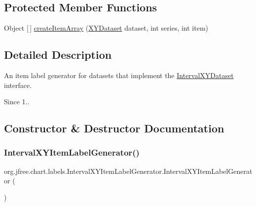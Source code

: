 \subsection*{Protected Member Functions}
\begin{DoxyCompactItemize}
\item 
Object \mbox{[}$\,$\mbox{]} \mbox{\hyperlink{classorg_1_1jfree_1_1chart_1_1labels_1_1_interval_x_y_item_label_generator_a09e87023b65353448e9fedcd251ef09e}{create\+Item\+Array}} (\mbox{\hyperlink{interfaceorg_1_1jfree_1_1data_1_1xy_1_1_x_y_dataset}{X\+Y\+Dataset}} dataset, int series, int item)
\end{DoxyCompactItemize}


\subsection{Detailed Description}
An item label generator for datasets that implement the \mbox{\hyperlink{}{Interval\+X\+Y\+Dataset}} interface.

\begin{DoxySince}{Since}
1.. 
\end{DoxySince}


\subsection{Constructor \& Destructor Documentation}
\mbox{\label{classorg_1_1jfree_1_1chart_1_1labels_1_1_interval_x_y_item_label_generator_ac4fe566347dde57484028ca445fec49f}} 
\subsubsection{\texorpdfstring{Interval\+X\+Y\+Item\+Label\+Generator()}{IntervalXYItemLabelGenerator()}\hspace{0.1cm}{\footnotesize\ttfamily [1/5]}}
{\footnotesize\ttfamily org.\+jfree.\+chart.\+labels.\+Interval\+X\+Y\+Item\+Label\+Generator.\+Interval\+X\+Y\+Item\+Label\+Generator (\begin{DoxyParamCaption}{ }\end{DoxyParamCaption})}


